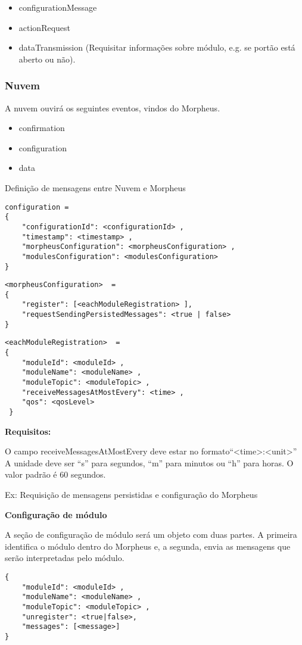 \begin{itemize}
\item configurationMessage
\item actionRequest
\item dataTransmission (Requisitar informações sobre módulo, e.g. se portão está aberto ou não).
\end{itemize}

\subsubsection{Nuvem}
A nuvem ouvirá os seguintes eventos, vindos do Morpheus.

\begin{itemize}
\item confirmation
\item configuration
\item data
\end{itemize}

Definição de mensagens entre Nuvem e Morpheus
\begin{lstlisting}
configuration =
{
    "configurationId": <configurationId> ,
    "timestamp": <timestamp> ,
    "morpheusConfiguration": <morpheusConfiguration> ,
    "modulesConfiguration": <modulesConfiguration>
}
\end{lstlisting}

\begin{lstlisting}
<morpheusConfiguration>  =
{
    "register": [<eachModuleRegistration> ],
    "requestSendingPersistedMessages": <true | false>
}
\end{lstlisting}

\begin{lstlisting}
<eachModuleRegistration>  =
{
    "moduleId": <moduleId> ,
    "moduleName": <moduleName> ,
    "moduleTopic": <moduleTopic> ,
    "receiveMessagesAtMostEvery": <time> ,
    "qos": <qosLevel>
 }
 \end{lstlisting}


\textbf{Requisitos:}

O campo receiveMessagesAtMostEvery deve estar no formato“\textless time\textgreater :\textless unit\textgreater ”
A unidade deve ser “s” para segundos, “m” para minutos ou “h” para horas. O valor padrão é 60 segundos.

Ex: Requisição de mensagens persistidas e configuração do Morpheus

\textbf{Configuração de módulo}

A seção de configuração de módulo será um objeto com duas partes. A primeira identifica o módulo dentro do Morpheus e, a segunda, envia as mensagens que serão interpretadas pelo módulo.
\begin{lstlisting}
{
    "moduleId": <moduleId> ,
    "moduleName": <moduleName> ,
    "moduleTopic": <moduleTopic> ,
    "unregister": <true|false>,
    "messages": [<message>]
}
\end{lstlisting}

